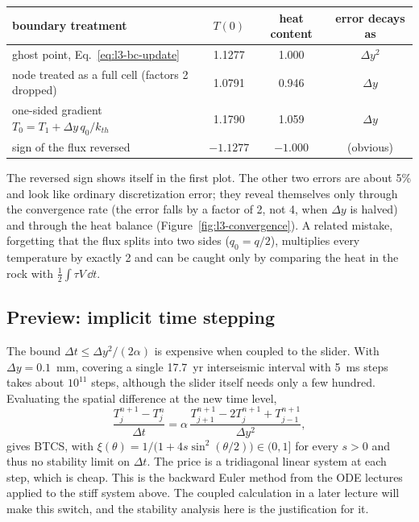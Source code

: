 \begin{center}
\small
\begin{tabular}{lccc}
\toprule
boundary treatment & $T(0)$ & heat content & error decays as \\
\midrule
ghost point, Eq.~\eqref{eq:l3-bc-update} & 1.1277 & 1.000 & $\Delta y^2$ \\
node treated as a full cell (factors 2 dropped) & 1.0791 & 0.946 & $\Delta y$ \\
one-sided gradient $T_0=T_1+\Delta y\,q_0/k_{th}$ & 1.1790 & 1.059 & $\Delta y$ \\
sign of the flux reversed & $-1.1277$ & $-1.000$ & (obvious) \\
\bottomrule
\end{tabular}
\end{center}
The reversed sign shows itself in the first plot. The other two errors are about 5\% and look like ordinary discretization error; they reveal themselves only through the convergence rate (the error falls by a factor of 2, not 4, when $\Delta y$ is halved) and through the heat balance (Figure~\ref{fig:l3-convergence}). A related mistake, forgetting that the flux splits into two sides ($q_0=q/2$), multiplies every temperature by exactly 2 and can be caught only by comparing the heat in the rock with $\tfrac12\int\tau V\,\dd t$.

\subsection{Preview: implicit time stepping}

The bound $\Delta t\le\Delta y^2/(2\alpha)$ is expensive when coupled to the slider. With $\Delta y=0.1$~mm, covering a single 17.7~yr interseismic interval with 5~ms steps takes about $10^{11}$ steps, although the slider itself needs only a few hundred. Evaluating the spatial difference at the new time level,
\begin{equation}
\frac{T_j^{n+1}-T_j^n}{\Delta t}=\alpha\,\frac{T_{j+1}^{n+1}-2T_j^{n+1}+T_{j-1}^{n+1}}{\Delta y^2},
\end{equation}
gives BTCS, with $\xi(\theta)=1/\big(1+4s\sin^2(\theta/2)\big)\in(0,1]$ for every $s>0$ and thus no stability limit on $\Delta t$. The price is a tridiagonal linear system at each step, which is cheap. This is the backward Euler method from the ODE lectures applied to the stiff system above. The coupled calculation in a later lecture will make this switch, and the stability analysis here is the justification for it.

